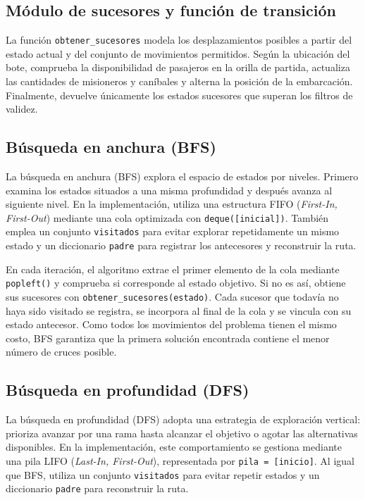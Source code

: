 \documentclass[
  spanish,
  11pt,
]{article}
\begin{document}
\subsection{Módulo de sucesores y función de
transición}\label{muxf3dulo-de-sucesores-y-funciuxf3n-de-transiciuxf3n}

La función \texttt{obtener\_sucesores} modela los desplazamientos
posibles a partir del estado actual y del conjunto de movimientos
permitidos. Según la ubicación del bote, comprueba la disponibilidad de
pasajeros en la orilla de partida, actualiza las cantidades de
misioneros y caníbales y alterna la posición de la embarcación.
Finalmente, devuelve únicamente los estados sucesores que superan los
filtros de validez.

\subsection{Búsqueda en anchura (BFS)}\label{buxfasqueda-en-anchura-bfs}

La búsqueda en anchura (BFS) explora el espacio de estados por niveles.
Primero examina los estados situados a una misma profundidad y después
avanza al siguiente nivel. En la implementación, utiliza una estructura
FIFO (\emph{First-In, First-Out}) mediante una cola optimizada con
\texttt{deque({[}inicial{]})}. También emplea un conjunto
\texttt{visitados} para evitar explorar repetidamente un mismo estado y
un diccionario \texttt{padre} para registrar los antecesores y
reconstruir la ruta.

En cada iteración, el algoritmo extrae el primer elemento de la cola
mediante \texttt{popleft()} y comprueba si corresponde al estado
objetivo. Si no es así, obtiene sus sucesores con
\texttt{obtener\_sucesores(estado)}. Cada sucesor que todavía no haya
sido visitado se registra, se incorpora al final de la cola y se vincula
con su estado antecesor. Como todos los movimientos del problema tienen
el mismo costo, BFS garantiza que la primera solución encontrada
contiene el menor número de cruces posible.

\subsection{Búsqueda en profundidad
(DFS)}\label{buxfasqueda-en-profundidad-dfs}

La búsqueda en profundidad (DFS) adopta una estrategia de exploración
vertical: prioriza avanzar por una rama hasta alcanzar el objetivo o
agotar las alternativas disponibles. En la implementación, este
comportamiento se gestiona mediante una pila LIFO (\emph{Last-In,
First-Out}), representada por \texttt{pila\ =\ {[}inicio{]}}. Al igual
que BFS, utiliza un conjunto \texttt{visitados} para evitar repetir
estados y un diccionario \texttt{padre} para reconstruir la ruta.
\end{document}
